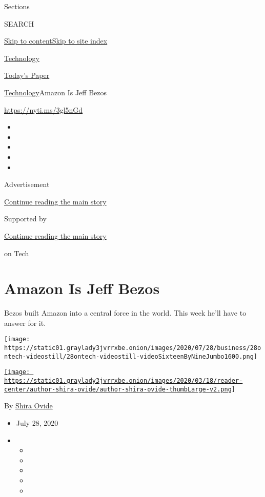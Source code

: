 Sections

SEARCH

\protect\hyperlink{site-content}{Skip to
content}\protect\hyperlink{site-index}{Skip to site index}

\href{https://www.nytimes3xbfgragh.onion/section/technology}{Technology}

\href{https://myaccount.nytimes3xbfgragh.onion/auth/login?response_type=cookie\&client_id=vi}{}

\href{https://www.nytimes3xbfgragh.onion/section/todayspaper}{Today's
Paper}

\href{/section/technology}{Technology}\textbar{}Amazon Is Jeff Bezos

\href{https://nyti.ms/3gl5nGd}{https://nyti.ms/3gl5nGd}

\begin{itemize}
\item
\item
\item
\item
\item
\end{itemize}

Advertisement

\protect\hyperlink{after-top}{Continue reading the main story}

Supported by

\protect\hyperlink{after-sponsor}{Continue reading the main story}

on Tech

\hypertarget{amazon-is-jeff-bezos}{%
\section{Amazon Is Jeff Bezos}\label{amazon-is-jeff-bezos}}

Bezos built Amazon into a central force in the world. This week he'll
have to answer for it.

\texttt{[image: https://static01.graylady3jvrrxbe.onion/images/2020/07/28/business/28ontech-videostill/28ontech-videostill-videoSixteenByNineJumbo1600.png]}

\href{https://www.nytimes3xbfgragh.onion/by/shira-ovide}{\texttt{[image: https://static01.graylady3jvrrxbe.onion/images/2020/03/18/reader-center/author-shira-ovide/author-shira-ovide-thumbLarge-v2.png]}}

By \href{https://www.nytimes3xbfgragh.onion/by/shira-ovide}{Shira Ovide}

\begin{itemize}
\item
  July 28, 2020
\item
  \begin{itemize}
  \item
  \item
  \item
  \item
  \item
  \end{itemize}
\end{itemize}

